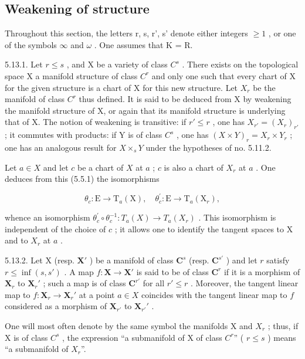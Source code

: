 \subsection{Weakening of structure}

Throughout this section, the letters r, s, r', s' denote either integers \(\geqslant1\) , or one of the symbols \(\infty\) and \(\omega\) . One assumes that K = R.

5.13.1. Let \(r \leqslant s\) , and X be a variety of class \(C^s\) . There exists on the topological space X a manifold structure of class \(C^r\) and only one such that every chart of X for the given structure is a chart of X for this new structure. Let \(X_r\) be the manifold of class \(C^r\) thus defined. It is said to be deduced from X by weakening the manifold structure of X, or again that its manifold structure is underlying that of X. The notion of weakening is transitive: if \(r' \leqslant r\) , one has \(X_{r'} = (X_r)_{r'}\) ; it commutes with products: if Y is of class \(C^s\) , one has \((X \times Y)_r = X_r \times Y_r\) ; one has an analogous result for \(X \times_s Y\) under the hypotheses of no. 5.11.2.

Let \(a\in X\) and let \(c\) be a chart of \(X\) at \(a\) ; \(c\) is also a chart of \(X_r\) at \(a\) . One deduces from this (5.5.1) the isomorphisms

\[
\theta_ {c}: \mathrm{E} \rightarrow \mathrm{T} _ {a} (\mathrm{X}), \quad \theta_ {c} ^ {\prime}: \mathrm{E} \rightarrow \mathrm{T} _ {a} (\mathrm{X} _ {r}),
\]

whence an isomorphism \(\theta_{c}^{\prime}\circ\theta_{c}^{-1}:T_{a}(X)\to T_{a}(X_{r})\) . This isomorphism is independent of the choice of \(c\) ; it allows one to identify the tangent spaces to X and to \(X_{r}\) at \(a\) .

5.13.2. Let X (resp. \(\mathbf{X}'\) ) be a manifold of class \(\mathbf{C}^s\) (resp. \(\mathbf{C}^{s'}\) ) and let \(r\) satisfy \(r \leqslant \inf(s, s')\) . A map \(f: \mathbf{X} \to \mathbf{X}'\) is said to be of class \(\mathbf{C}^r\) if it is a morphism of \(\mathbf{X}_r\) to \(\mathbf{X}_r'\) ; such a map is of class \(\mathbf{C}^{r'}\) for all \(r' \leqslant r\) . Moreover, the tangent linear map to \(f: \mathbf{X}_r \to \mathbf{X}_r'\) at a point \(a \in X\) coincides with the tangent linear map to \(f\) considered as a morphism of \(\mathbf{X}_{r'}\) to \(\mathbf{X}_{r'}'\) .

One will most often denote by the same symbol the manifolds X and \(X_{r}\) ; thus, if X is of class \(C^{s}\) , the expression “a submanifold of X of class \(C^{r}\)” ( \(r \leqslant s\) ) means “a submanifold of \(X_{r}\)”.

